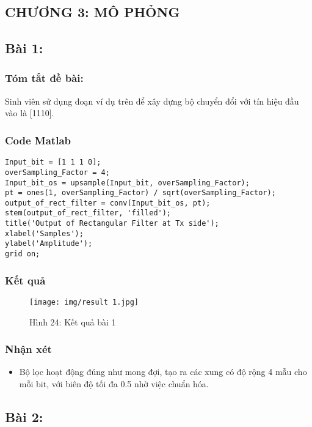 \documentclass[a4paper,13pt]{article}
\begin{document}
\clearpage
\begin{center}
    \section{CHƯƠNG 3: MÔ PHỎNG}
\end{center}
\subsection{Bài 1:}
\subsubsection*{Tóm tắt đề bài:} Sinh viên sử dụng đoạn ví dụ trên để xây dựng bộ chuyển đổi với tín hiệu đầu vào là [1110].
\subsubsection*{Code Matlab}
\begin{lstlisting}
Input_bit = [1 1 1 0];       
overSampling_Factor = 4;         
Input_bit_os = upsample(Input_bit, overSampling_Factor);  
pt = ones(1, overSampling_Factor) / sqrt(overSampling_Factor);  
output_of_rect_filter = conv(Input_bit_os, pt);
stem(output_of_rect_filter, 'filled');
title('Output of Rectangular Filter at Tx side');
xlabel('Samples');
ylabel('Amplitude');
grid on;
\end{lstlisting}
\subsubsection*{Kết quả}
\begin{figure}[htbp]
    \centering
    \texttt{[image: img/result 1.jpg]}
    \caption*{Hình 24: Kết quả bài 1}
    \label{fig:model}
\end{figure}
\subsubsection*{Nhận xét}
\begin{itemize}
    \item Bộ lọc hoạt động đúng như mong đợi, tạo ra các xung có độ rộng 4 mẫu cho mỗi bit, với biên độ tối đa 0.5 nhờ việc chuẩn hóa. 
\end{itemize}
\clearpage

\subsection{Bài 2:}
\end{document}
